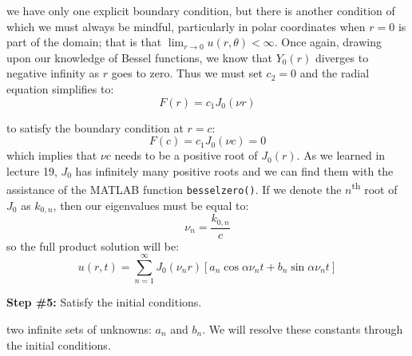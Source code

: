  we have only one explicit boundary condition, but there is another condition of which we must always be mindful, particularly in polar coordinates when $r=0$ is part of the domain; that is that $\lim_{r \to 0} u(r,\theta) < \infty$.  Once again, drawing upon our knowledge of Bessel functions, we know that $Y_0(r)$ diverges to negative infinity as $r$ goes to zero.  Thus we must set $c_2 = 0$ and the radial equation simplifies to:
\begin{equation*}
F(r) = c_1J_0(\nu r)
\end{equation*} 

 to satisfy the boundary condition at $r=c$:
\begin{equation*}
F(c) = c_1J_0(\nu c) = 0
\end{equation*}
which implies that $\nu c$ needs to be a positive root of $J_0(r)$.  As we learned in lecture 19, $J_0$ has infinitely many positive roots and we can find them with the assistance of the MATLAB function \lstinline[style=myMatlab]{besselzero()}.  If we denote the $n$\textsuperscript{th} root of $J_0$ as $k_{0,n}$, then our eigenvalues must be equal to:
\begin{equation*}
\nu_n = \frac{k_{0,n}}{c}
\end{equation*}
so the full product solution will be:
\begin{equation*}
u(r,t) = \sum\limits_{n=1}^{\infty} J_0(\nu_n r)\left[a_n \cos{\alpha \nu_n t} + b_n \sin{\alpha \nu_n t} \right]
\end{equation*}

\vspace{0.25cm}

\noindent\textbf{Step \#5:} Satisfy the initial conditions.

\vspace{0.25cm}

 two infinite sets of unknowns: $a_n$ and $b_n$.  We will resolve these constants through the initial conditions.

